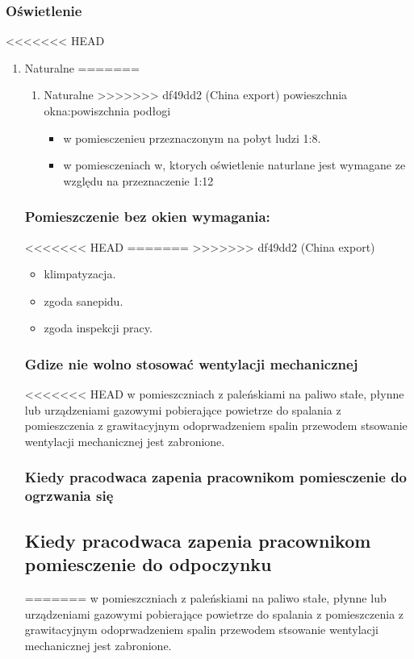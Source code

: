 \documentclass[11pt]{article}
\begin{document}
\subsubsection{Oświetlenie}
<<<<<<< HEAD
\label{sec:org4656ca2}
\begin{enumerate}
\item Naturalne
\label{sec:orgde98694}
=======
\label{sec:org2b6f020}
\begin{enumerate}
\item Naturalne
\label{sec:org776f493}
>>>>>>> df49dd2 (China export)
powieszchnia okna:powiszchnia podłogi
\begin{itemize}
\item w pomiesczenieu przeznaczonym na pobyt ludzi 1:8.
\item w pomiesczeniach w, ktorych oświetlenie naturlane jest wymagane ze względu na przeznaczenie 1:12
\end{itemize}
\end{enumerate}
\subsubsection{Pomieszczenie bez okien wymagania:}
<<<<<<< HEAD
\label{sec:orga9ad77b}
=======
\label{sec:orgbe9f0a5}
>>>>>>> df49dd2 (China export)
\begin{itemize}
\item klimpatyzacja.
\item zgoda sanepidu.
\item zgoda inspekcji pracy.
\end{itemize}
\subsubsection{Gdize nie wolno stosować wentylacji mechanicznej}
<<<<<<< HEAD
\label{sec:org08271c0}
w pomieszczniach z paleńskiami na paliwo stałe, płynne lub urządzeniami gazowymi pobierające powietrze do spalania z pomieszczenia z grawitacyjnym odoprwadzeniem spalin przewodem stsowanie wentylacji mechanicznej jest zabronione.
\subsubsection{Kiedy pracodwaca zapenia pracownikom pomiesczenie do ogrzwania się}
\label{sec:org03f19a2}

\subsection{Kiedy pracodwaca zapenia pracownikom pomiesczenie do odpoczynku}
\label{sec:orgb5544e3}
=======
\label{sec:orgcb073b6}
w pomieszczniach z paleńskiami na paliwo stałe, płynne lub urządzeniami gazowymi pobierające powietrze do spalania z pomieszczenia z grawitacyjnym odoprwadzeniem spalin przewodem stsowanie wentylacji mechanicznej jest zabronione.

\end{enumerate}
\end{document}
